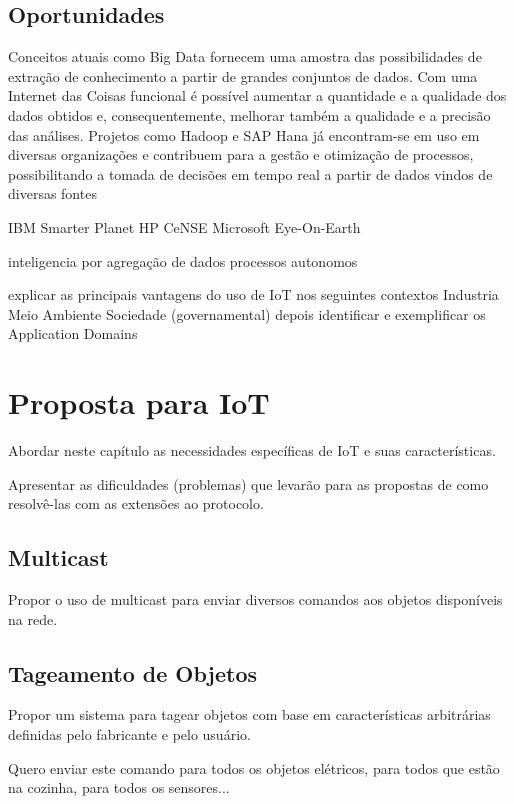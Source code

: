 \documentclass[twoside,english,brazilian]{UNISINOSmonografia}
\begin{document}
\section{Oportunidades}


Conceitos atuais como Big Data fornecem uma amostra das possibilidades de 
extração de conhecimento a partir de grandes conjuntos de dados. 
Com uma Internet das Coisas funcional é possível aumentar a quantidade e a 
qualidade dos dados obtidos e, consequentemente, melhorar também a 
qualidade e a precisão das análises.
Projetos como Hadoop e SAP Hana já encontram-se em uso em diversas 
organizações e contribuem para a gestão e otimização de processos, 
possibilitando a tomada de decisões em tempo real a partir de dados 
vindos de diversas fontes

\cite{Coetzee2011}
	IBM Smarter Planet 
	HP CeNSE
	Microsoft Eye-On-Earth
	
	inteligencia por agregação de dados
	processos autonomos
	
	explicar as principais vantagens do uso de IoT nos seguintes contextos
	Industria
	Meio Ambiente
	Sociedade (governamental)
	depois identificar e exemplificar os Application Domains 
	\cite[p.~41]{Sundmaeker2010}


\chapter{Proposta para IoT}

	Abordar neste capítulo as necessidades específicas de IoT e suas 
	características.
	
	Apresentar as dificuldades (problemas) que levarão para as propostas
	de como resolvê-las com as extensões ao protocolo.
	
	
	\section{Multicast}
		
		Propor o uso de multicast para enviar diversos comandos aos objetos
		disponíveis na rede.
		
		
	\section{Tageamento de Objetos}
		
		Propor um sistema para tagear objetos com base em características
		arbitrárias definidas pelo fabricante e pelo usuário.
		
		Quero enviar este comando para todos os objetos elétricos, para
		todos que estão na cozinha, para todos os sensores...
		
\end{document}
